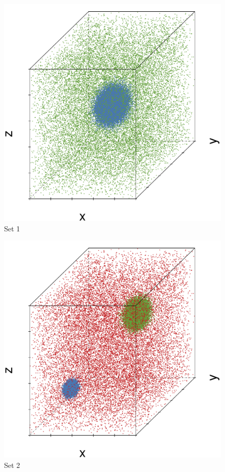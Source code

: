 
\begin{subfigure}{0.18\textwidth}
	\centering
	\includegraphics[width=\textwidth]{3/img/datasetplot_ferdosi_1_60000.pdf}
	\caption{Set 1}
	\label{fig:3:simulated:datasets:ferdosi1}
\end{subfigure}
\begin{subfigure}{0.18\textwidth}
	\centering
	\includegraphics[width=\textwidth]{3/img/datasetplot_ferdosi_2_60000.pdf}
	\caption{Set 2}
	\label{fig:3:simulated:datasets:ferdosi2}
\end{subfigure}	
